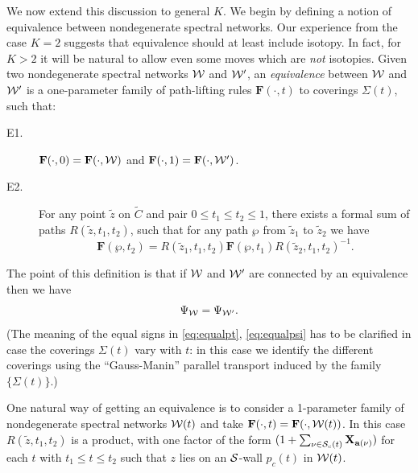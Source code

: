 \documentclass[11pt,a4paper]{article}
\def\wnet {{\cal W}}
\def\cS {{\cal S}}
\def\tz{{\tilde z}}
\def\ba{\mathbf{a}}
\def\bF{\mathbf{F}}
\def\bX{\mathbf{X}}
\newcommand{\ti}[1]{\textit{#1}}
\def\wnet {{\cal W}}
\begin{document}
We now extend this discussion to general $K$.  We begin by defining a notion of equivalence between
nondegenerate spectral networks.  Our experience from the case $K=2$ suggests that equivalence should at least include isotopy.
In fact, for $K > 2$ it will be natural to
allow even some moves which are \ti{not} isotopies.  Given two
nondegenerate spectral networks $\wnet$ and $\wnet'$, an
\ti{equivalence} between $\wnet$ and $\wnet'$ is a one-parameter family of path-lifting rules
$\bF(\cdot, t)$ to coverings $\Sigma(t)$, such that:

\begin{description}
\item[E1.] $\bF(\cdot, 0) = \bF(\cdot, \wnet)$ and $\bF(\cdot, 1) = \bF(\cdot, \wnet')$.

\item[E2.] For any point $\tz$ on $\tilde{C}$ and pair $0 \le t_1 \le t_2 \le 1$, there exists a formal sum of paths
$R(\tz, t_1, t_2)$, such that for any path $\wp$ from $\tz_1$ to $\tz_2$ we have
\begin{equation} \label{eq:equalpt}
 \bF(\wp, t_2) = R(\tz_1, t_1, t_2) \bF(\wp, t_1) R(\tz_2, t_1, t_2)^{-1}.
\end{equation}
\end{description}
The point of this definition is that if $\wnet$ and $\wnet'$ are connected by an equivalence then we have
\begin{equation} \label{eq:equalpsi}
\Psi_\wnet = \Psi_{\wnet'}.
\end{equation}
(The meaning of the equal signs in \eqref{eq:equalpt}, \eqref{eq:equalpsi} has
to be clarified in case the coverings $\Sigma(t)$ vary with $t$:  in this case
we identify the different coverings using the ``Gauss-Manin'' parallel transport induced by
the family $\{\Sigma(t)\}$.)

One natural way of getting an equivalence is to consider a 1-parameter family of nondegenerate spectral networks $\wnet(t)$
and take $\bF(\cdot, t) = \bF(\cdot, \wnet(t))$.  In this case $R(\tz, t_1, t_2)$ is a product,
with one factor of the form $(1 + \sum_{\nu \in \cS_c(t)} \bX_{\ba(\nu)})$ for each $t$ with $t_1 \le t \le t_2$
such that $z$ lies on an $\cS$-wall $p_c(t)$ in $\wnet(t)$.
\end{document}
